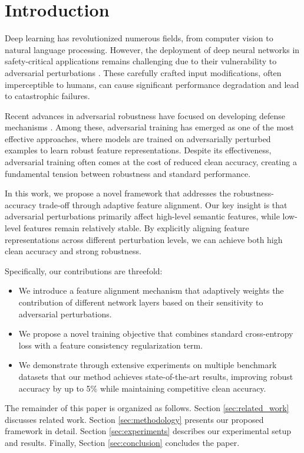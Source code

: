 \section{Introduction}
\label{sec:introduction}

Deep learning has revolutionized numerous fields, from computer vision to natural language processing. However, the deployment of deep neural networks in safety-critical applications remains challenging due to their vulnerability to adversarial perturbations \cite{goodfellow2014explaining, szegedy2013intriguing}. These carefully crafted input modifications, often imperceptible to humans, can cause significant performance degradation and lead to catastrophic failures.

Recent advances in adversarial robustness have focused on developing defense mechanisms \cite{madry2017towards, wong2020fast, zhang2019theoretically}. Among these, adversarial training has emerged as one of the most effective approaches, where models are trained on adversarially perturbed examples to learn robust feature representations. Despite its effectiveness, adversarial training often comes at the cost of reduced clean accuracy, creating a fundamental tension between robustness and standard performance.

In this work, we propose a novel framework that addresses the robustness-accuracy trade-off through adaptive feature alignment. Our key insight is that adversarial perturbations primarily affect high-level semantic features, while low-level features remain relatively stable. By explicitly aligning feature representations across different perturbation levels, we can achieve both high clean accuracy and strong robustness.

Specifically, our contributions are threefold:
\begin{itemize}
    \item We introduce a feature alignment mechanism that adaptively weights the contribution of different network layers based on their sensitivity to adversarial perturbations.
    \item We propose a novel training objective that combines standard cross-entropy loss with a feature consistency regularization term.
    \item We demonstrate through extensive experiments on multiple benchmark datasets that our method achieves state-of-the-art results, improving robust accuracy by up to 5\% while maintaining competitive clean accuracy.
\end{itemize}

The remainder of this paper is organized as follows. Section \ref{sec:related_work} discusses related work. Section \ref{sec:methodology} presents our proposed framework in detail. Section \ref{sec:experiments} describes our experimental setup and results. Finally, Section \ref{sec:conclusion} concludes the paper.